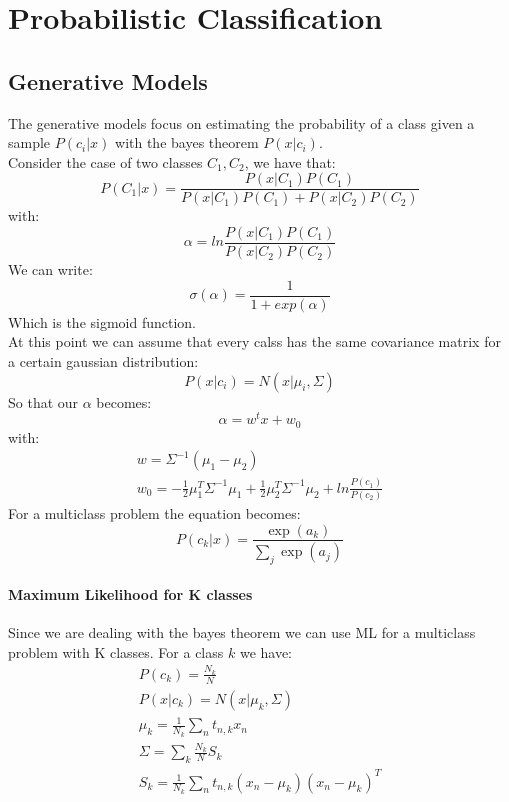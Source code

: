 

\section{Probabilistic Classification}

\subsection{ Generative Models}
The generative models focus on estimating the probability of a class given a sample $P(c_i|x)$ with the bayes theorem $P(x|c_i)$.\\
Consider the case of two classes $C_1,C_2$, we have that:
\[P(C_1|x)=\frac{P(x|C_1)P(C_1)}{P(x|C_1)P(C_1)+P(x|C_2)P(C_2)}\]
with:
\[\alpha=ln\frac{P(x|C_1)P(C_1)}{P(x|C_2)P(C_2)}\]
We can write:
\[\sigma(\alpha)=\frac{1}{1+exp(\alpha)}\]
Which is the sigmoid function.\\
At this point we can assume that every calss has the same covariance matrix for a certain gaussian distribution:
$$P(x|c_i)=N(x|\mu_i,\Sigma)$$
So that our $\alpha$ becomes:
$$\alpha=w^tx+w_0$$
with:
\begin{equation}
\begin{aligned}
w=\Sigma^{-1}(\mu_1-\mu_2)\\
w_0=-\frac{1}{2}\mu_1^T \Sigma^{-1}\mu_1 +\frac{1}{2}\mu_2^T \Sigma^{-1}\mu_2+ ln\frac{P(c_1)}{P(c_2)} 
\end{aligned}
\end{equation}
For a multiclass problem the equation becomes:
$$P(c_k|x)=\frac{\exp(a_k)}{\sum_j \exp(a_j)}$$

\paragraph{Maximum Likelihood for K classes}
Since we are dealing with the bayes theorem we can use ML for a multiclass problem with K classes. For a class $k$ we have:
\begin{equation}
\begin{aligned}
P(c_k)=\frac{N_k}{N}\\
P(x|c_k)=N(x|\mu_k,\Sigma)\\
\mu_k=\frac{1}{N_k}\sum_n t_{n,k}x_n\\
\Sigma=\sum_k \frac{N_k}{N}S_k\\
S_k=\frac{1}{N_k}\sum_n  t_{n,k}(x_n-\mu_k)(x_n-\mu_k)^T
\end{aligned}
\end{equation}

